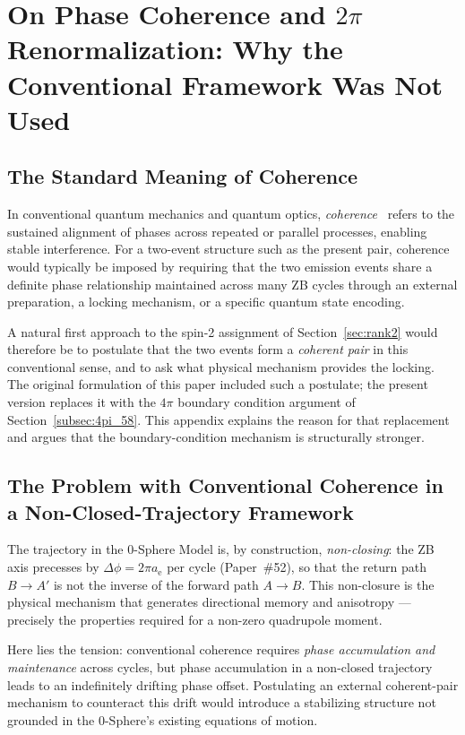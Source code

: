 \documentclass[%
 reprint, amsmath,amssymb, aps, prb, ]{revtex4-2}
\numberwithin{equation}{section}
\newcommand{\anom}{a_{\mathrm{e}}}
\begin{document}
\section{On Phase Coherence and $2\pi$ Renormalization: Why the Conventional Framework Was Not Used}
\label{app:coherence}

\subsection{The Standard Meaning of Coherence}

In conventional quantum mechanics and quantum optics, \emph{coherence}~\cite{Glauber1963} refers to the sustained alignment of phases across repeated or parallel processes, enabling stable interference.
For a two-event structure such as the present pair, coherence would typically be imposed by requiring that the two emission events share a definite phase relationship maintained across many ZB cycles through an external preparation, a locking mechanism, or a specific quantum state encoding.

A natural first approach to the spin-2 assignment of Section~\ref{sec:rank2} would therefore be to postulate that the two events form a \emph{coherent pair} in this conventional sense, and to ask what physical mechanism provides the locking.
The original formulation of this paper included such a postulate; the present version replaces it with the $4\pi$ boundary condition argument of Section~\ref{subsec:4pi_58}.
This appendix explains the reason for that replacement and argues that the boundary-condition mechanism is structurally stronger.

\subsection{The Problem with Conventional Coherence in a Non-Closed-Trajectory Framework}

The trajectory in the 0-Sphere Model is, by construction, \emph{non-closing}: the ZB axis precesses by $\Delta\phi = 2\pi\anom$ per cycle (Paper~\#52), so that the return path $B \to A'$ is not the inverse of the forward path $A \to B$.
This non-closure is the physical mechanism that generates directional memory and anisotropy --- precisely the properties required for a non-zero quadrupole moment.

Here lies the tension: conventional coherence requires \emph{phase accumulation and maintenance} across cycles, but phase accumulation in a non-closed trajectory leads to an indefinitely drifting phase offset.
Postulating an external coherent-pair mechanism to counteract this drift would introduce a stabilizing structure not grounded in the 0-Sphere's existing equations of motion.
\end{document}
